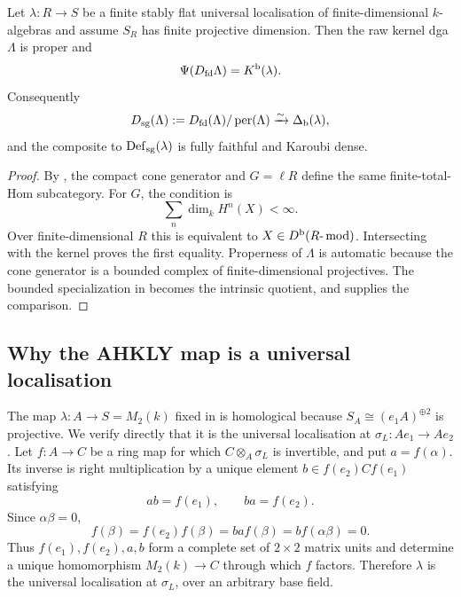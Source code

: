 \begin{theorem}\label{thm:kernel-dictionary}
Let \(\lambda:R\to S\) be a finite stably flat universal localisation of finite-dimensional \(k\)-algebras and assume \(S_R\) has finite projective dimension.  Then the raw kernel dga \(\Lambda\) is proper and
\[
 \Psi(D_{\mathrm{fd}}\Lambda)=K^{\mathrm b}(\lambda).
\]
Consequently
\[
 D_{\mathrm{sg}}(\Lambda):=D_{\mathrm{fd}}(\Lambda)/\operatorname{per}(\Lambda)
 \xrightarrow{\sim}\Delta_{\mathrm b}(\lambda),
\]
and the composite to \(\operatorname{Def}_{\mathrm{sg}}(\lambda)\) is fully faithful and Karoubi dense.
\end{theorem}

\begin{proof}
By , the compact cone generator and \(G=\ell R\) define the same finite-total-Hom subcategory.  For \(G\), the condition is
\[
 \sum_n\dim_kH^n(X)<\infty.
\]
Over finite-dimensional \(R\) this is equivalent to \(X\in D^{\mathrm b}(R\text{-}\operatorname{mod})\).  Intersecting with the kernel proves the first equality.  Properness of \(\Lambda\) is automatic because the cone generator is a bounded complex of finite-dimensional projectives.  The bounded specialization in  becomes the intrinsic quotient, and  supplies the comparison.
\end{proof}

\subsection{Why the AHKLY map is a universal localisation}
The map \(\lambda:A\to S=M_2(k)\) fixed in  is homological because \(S_A\cong(e_1A)^{\oplus2}\) is projective.  We verify directly that it is the universal localisation at \(\sigma_L:Ae_1\to Ae_2\).  Let \(f:A\to C\) be a ring map for which \(C\otimes_A\sigma_L\) is invertible, and put \(a=f(\alpha)\).  Its inverse is right multiplication by a unique element
\(b\in f(e_2)Cf(e_1)\) satisfying
\[
 ab=f(e_1),
 \qquad
 ba=f(e_2).
\]
Since \(\alpha\beta=0\),
\[
 f(\beta)=f(e_2)f(\beta)=ba f(\beta)=b f(\alpha\beta)=0.
\]
Thus \(f(e_1),f(e_2),a,b\) form a complete set of \(2\times2\) matrix units and determine a unique homomorphism \(M_2(k)\to C\) through which \(f\) factors.  Therefore \(\lambda\) is the universal localisation at \(\sigma_L\), over an arbitrary base field.
